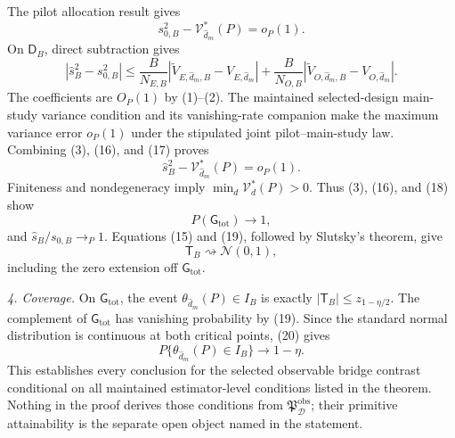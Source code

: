 The pilot allocation result gives
\[
 s_{0,B}^2-\mathcal V_{\widehat d_m}^*(P)=o_P(1). \tag{16}
\]
On \(\mathsf D_B\), direct subtraction gives
\[
 |\widehat s_B^2-s_{0,B}^2|
 \le \frac{B}{N_{E,B}}
 |\widetilde V_{E,\widehat d_m,B}-V_{E,\widehat d_m}|
 +\frac{B}{N_{O,B}}
 |\widetilde V_{O,\widehat d_m,B}-V_{O,\widehat d_m}|. \tag{17}
\]
The coefficients are \(O_P(1)\) by (1)--(2).  The maintained selected-design main-study variance condition and its vanishing-rate companion make the maximum variance error \(o_P(1)\) under the stipulated joint pilot--main-study law.  Combining (3), (16), and (17) proves
\[
 \widehat s_B^2-\mathcal V_{\widehat d_m}^*(P)=o_P(1). \tag{18}
\]
Finiteness and nondegeneracy imply \(\min_d\mathcal V_d^*(P)>0\).  Thus (3), (16), and (18) show
\[
 P(\mathsf G_{\mathrm{tot}})\longrightarrow1, \tag{19}
\]
and \(\widehat s_B/s_{0,B}\to_P1\).  Equations (15) and (19), followed by Slutsky's theorem, give
\[
 \mathsf T_B\rightsquigarrow\mathcal N(0,1), \tag{20}
\]
including the zero extension off \(\mathsf G_{\mathrm{tot}}\).

\emph{4. Coverage.}
On \(\mathsf G_{\mathrm{tot}}\), the event \(\theta_{\widehat d_m}(P)\in I_B\) is exactly \(|\mathsf T_B|\le z_{1-\eta/2}\).  The complement of \(\mathsf G_{\mathrm{tot}}\) has vanishing probability by (19).  Since the standard normal distribution is continuous at both critical points, (20) gives
\[
 P\{\theta_{\widehat d_m}(P)\in I_B\}\longrightarrow1-\eta.
\]
This establishes every conclusion for the selected observable bridge contrast conditional on all maintained estimator-level conditions listed in the theorem.  Nothing in the proof derives those conditions from \(\mathfrak P_{\mathcal D}^{\mathrm{obs}}\); their primitive attainability is the separate open object named in the statement.